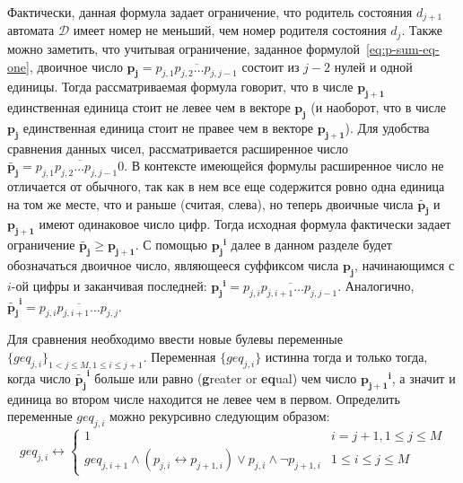 Фактически, данная формула задает ограничение, что родитель состояния $d_{j + 1}$ автомата $\mathcal{D}$ имеет номер не меньший, чем номер родителя состояния $d_{j}$. 
Также можно заметить, что учитывая ограничение, заданное формулой~\eqref{eq:p-sum-eq-one}, двоичное число $\mathbf{p_{j}}=\overline{p_{j,1}p_{j,2}\ldots p_{j,j-1}}$ состоит из $j - 2$ нулей и одной единицы.
Тогда рассматриваемая формула говорит, что в числе $\mathbf{p_{j + 1}}$ единственная единица стоит не левее чем в векторе $\mathbf{p_{j}}$ (и наоборот, что в числе $\mathbf{p_{j}}$ единственная единица стоит не правее чем в векторе $\mathbf{p_{j + 1}}$). 
Для удобства сравнения данных чисел, рассматривается расширенное число $\tilde{\mathbf{p_{j}}} = \overline{p_{j,1}p_{j,2}\ldots p_{j,j-1}0}$.
В контексте имеющейся формулы расширенное число не отличается от обычного, так как в нем все еще содержится ровно одна единица на том же месте, что и раньше (считая, слева), но теперь двоичные числа $\tilde{\mathbf{p_{j}}}$ и $\mathbf{p_{j+1}}$ имеют одинаковое число цифр.
Тогда исходная формула фактически задает ограничение $\tilde{\mathbf{p_{j}}} \geq \mathbf{p_{j + 1}}$.
С помощью $\mathbf{p_{j}}^{\mathbf{i}}$ далее в данном разделе будет обозначаться двоичное число, являющееся суффиксом числа $\mathbf{p_{j}}$, начинающимся с $i$-ой цифры и заканчивая последней: $\mathbf{p_{j}}^{\mathbf{i}}=\overline{p_{j,i}p_{j,i+1}\ldots p_{j,j - 1}}$.
Аналогично, $\tilde{\mathbf{p_{j}}}^{\mathbf{i}}=\overline{p_{j,i}p_{j,i+1}\ldots p_{j,j}}$.

Для сравнения необходимо ввести новые булевы переменные $\{\mathit{geq}_{j,i}\}_{1 < j \leq M, 1 \leq i \leq j + 1}$.
Переменная $\{\mathit{geq}_{j,i}\}$ истинна тогда и только тогда, когда число $\tilde{\mathbf{p_{j}}}^{\mathbf{i}}$ больше или равно (\textbf{g}reater or \textbf{eq}ual) чем число $\mathbf{p_{j + 1}}^{\mathbf{i}}$, а значит и единица во втором числе находится не левее чем в первом. 
Определить переменные $\mathit{geq}_{j,i}$ можно рекурсивно следующим образом:
%
\begin{equation}
\label{eq:geq-def}
  \mathit{geq}_{j,i} \leftrightarrow 
    \begin{cases} 
      1                               & i = j + 1, 1 \leq j \leq M \\
      \mathit{geq}_{j,i + 1} \wedge \left(p_{j,i} \leftrightarrow p_{j + 1, i}\right) \vee p_{j,i} \wedge \neg p_{j + 1, i}  & 1 \leq i \leq j \leq M
    \end{cases} 
\end{equation}

